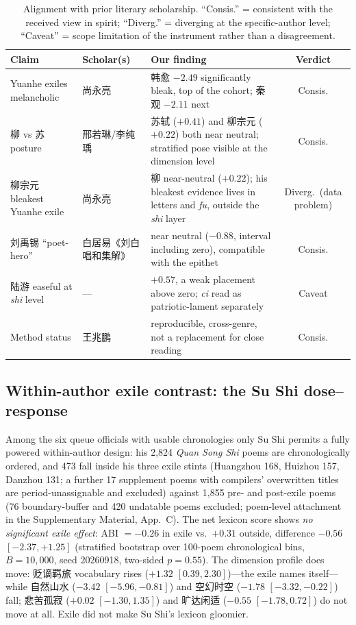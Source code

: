 \documentclass[10pt]{article}
\begin{document}
\begin{table}[H]
\centering\footnotesize
\caption{Alignment with prior literary scholarship. ``Consis.'' = consistent with the
received view in spirit; ``Diverg.'' = diverging at the specific-author level;
``Caveat'' = scope limitation of the instrument rather than a disagreement.}
\label{tab:lit}
\begin{tabular}{lp{2.6cm}p{2.3cm}c}
\toprule
Claim & Scholar(s) & Our finding & Verdict\\
\midrule
Yuanhe exiles melancholic & 尚永亮 & 韩愈 $-2.49$ significantly bleak, top of the
cohort; 秦观 $-2.11$ next & Consis.\\
柳 vs 苏 posture & 邢若琳/李纯瑀 & 苏轼 ($+0.41$) and 柳宗元 ($+0.22$) both
near neutral; stratified pose visible at the dimension level & Consis.\\
柳宗元 bleakest Yuanhe exile & 尚永亮 & 柳 near-neutral ($+0.22$); his bleakest
evidence lives in letters and \emph{fu}, outside the \emph{shi} layer & Diverg.\
(data problem)\\
刘禹锡 ``poet-hero'' & 白居易《刘白唱和集解》 & near neutral ($-0.88$, interval
including zero), compatible with the epithet & Consis.\\
陆游 easeful at \emph{shi} level & --- & $+0.57$, a weak placement above zero;
\emph{ci} read as patriotic-lament separately & Caveat\\
Method status & 王兆鹏 \citep{wang2008finding} & reproducible, cross-genre, not a
replacement for close reading & Consis.\\
\bottomrule
\end{tabular}
\end{table}

\subsection{Within-author exile contrast: the Su Shi dose--response}
\label{sec:profiles:exile}
Among the six queue officials with usable chronologies only Su Shi permits a fully
powered within-author design: his 2{,}824 \emph{Quan Song Shi} poems are
chronologically ordered, and 473 fall inside his three exile stints (Huangzhou 168,
Huizhou 157, Danzhou 131; a further 17 supplement poems with compilers' overwritten titles are period-unassignable and excluded) against
1{,}855 pre- and post-exile poems (76 boundary-buffer and 420 undatable poems
excluded; poem-level attachment in the Supplementary Material, App.~C). The net lexicon score shows
\emph{no significant exile effect}: ABI $= -0.26$ in exile vs.\ $+0.31$ outside,
difference $-0.56$ $[-2.37,+1.25]$ (stratified bootstrap over 100-poem
chronological bins, $B{=}10{,}000$,
seed 20260918, two-sided $p{=}0.55$). The dimension profile does move: 贬谪羁旅 vocabulary rises
($+1.32$ $[0.39,2.30]$)---the exile names itself---while 自然山水 ($-3.42$
$[-5.96,-0.81]$) and 空幻时空 ($-1.78$ $[-3.32,-0.22]$) fall; 悲苦孤寂 ($+0.02$
$[-1.30,1.35]$) and 旷达闲适 ($-0.55$ $[-1.78,0.72]$) do not move at all. Exile
did not make Su Shi's lexicon gloomier.
\end{document}
